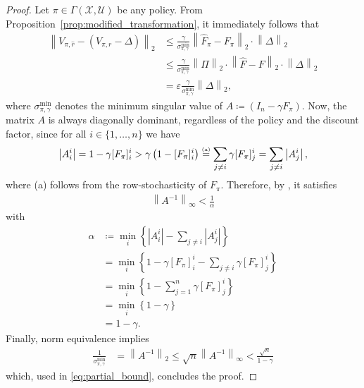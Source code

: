 \documentclass[10pt,leqno]{amsart}
\newcommand{\stkrl}[2]{\stackrel{\text{\tiny{(#1)}}}{#2}}
\newcommand{\norm}[1]{\left \|#1 \right \|}
\newcommand{\U}{\mathcal{U}}
\newcommand{\X}{\mathcal{X}}
\newcommand{\cost}{r}
\newcommand{\Vsym}{V}
\newcommand{\Varg}[1]{\Vsym_{#1}}
\newcommand{\F}{F}
\newcommand{\Ffb}[1]{\F_{#1}}
\newcommand{\Fapx}{\hat{F}}
\newcommand{\Fapxfb}[1]{\Fapx_{#1}}
\newcommand{\policy}{\pi}
\newcommand{\Sect}{\Gamma(\X, \U)}
\newcommand{\disc}{\gamma}
\newcommand{\twonorm}[1]{\norm{#1}_2}
\newcommand{\infnorm}[1]{\norm{#1}_\infty}
\begin{document}
\begin{proof}
    Let $\policy \in \Sect$ be any policy. From Proposition~\ref{prop:modified_transformation}, it immediately follows that
    \begin{align}\label{eq:partial_bound}
        \twonorm{\Varg{\policy, \hat{\cost}} - (\Varg{\policy, \cost} - \Delta)} &\leq \frac{\disc}{\sigma^{\min}_{\policy, \disc}} \twonorm{\Fapxfb{\policy} - \Ffb{\policy}} \cdot \twonorm{\Delta}\\
        &\leq \frac{\disc}{\sigma^{\min}_{\policy, \disc}} \twonorm{\Pi} \cdot \twonorm{\Fapx - \F } \cdot \twonorm{\Delta}\\
        &= \varepsilon \frac{\disc}{\sigma^{\min}_{\policy, \disc}} \twonorm{\Delta},
    \end{align}
    where $\sigma^{\min}_{\policy, \disc}$ denotes the minimum singular value of $A \coloneqq (I_n - \disc \Ffb{\policy})$. Now, the matrix $A$ is always diagonally dominant, regardless of the policy and the discount factor, since for all $i \in \{1, \hdots, n\}$ we have
    \begin{align*}
        \left|A_i^i\right| = 1 - \disc [\Ffb{\policy}]_i^i > \disc \left(1 - [\Ffb{\policy}]_i^i\right) \stkrl{a}{=} \sum_{j \neq i} \disc [\Ffb{\policy}]_j^i = \sum_{j \neq i} \left|A_j^i\right|,
    \end{align*}
    where (a) follows from the row-stochasticity of $\Ffb{\policy}$. Therefore, by \cite[Theorem 1]{VARAH19753}, it satisfies
    \begin{align*}
        \infnorm{A^{-1}} < \frac{1}{\alpha}
    \end{align*}
    with
    \begin{align*}
        \alpha &\coloneqq \min_i \left\{\left|A_i^i\right| - \sum_{j \neq i} \left|A_j^i\right|\right\}\\
        &= \min_i \left\{1 - \disc [\Ffb{\policy}]_i^i - \sum_{j \neq i} \disc [\Ffb{\policy}]_j^i\right\}\\
        &= \min_i \left\{1 - \sum_{j = 1}^n \disc [\Ffb{\policy}]_j^i\right\}\\
        &= \min_i \left\{1 - \disc \right\}\\
        &= 1 - \disc.
    \end{align*}
    Finally, norm equivalence implies
    \begin{align*}
        \frac{1}{\sigma^{\min}_{\policy, \disc}} &= \twonorm{A^{-1}} \leq \sqrt{n} \infnorm{A^{-1}} < \frac{\sqrt{n}}{1 - \disc}
    \end{align*}
    which, used in \eqref{eq:partial_bound}, concludes the proof.
\end{proof}
\end{document}
